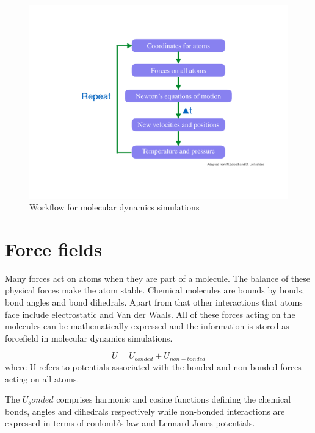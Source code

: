 \begin{figure}
\includegraphics[width=1.0\textwidth]{chapter1_figs/md_workflow.pdf}
\caption{Workflow for molecular dynamics simulations}
\label{fig:md_wf}
\end{figure}

\section{Force fields}
\label{ss:forcefield}
Many forces act on atoms when they are part of a molecule. The balance of these physical forces make the atom stable.
Chemical molecules are bounds by bonds, bond angles and bond dihedrals. Apart from that other interactions that atoms face include electrostatic and Van der Waals. All of these forces acting on the molecules can be mathematically expressed and the information is stored as forcefield in molecular dynamics simulations. \cite{Lin2016}

\begin{equation}
\label{eq:potentials}
 U = U_{bonded} + U_{non-bonded}   
\end{equation}
where U refers to potentials associated with the bonded and non-bonded forces acting on all atoms.\cite{Lin2016}

The $U_bonded$ comprises harmonic and cosine functions defining the 
chemical bonds, angles and dihedrals respectively while non-bonded interactions are expressed in terms of coulomb's law and Lennard-Jones 
potentials.\cite{Lin2016}

